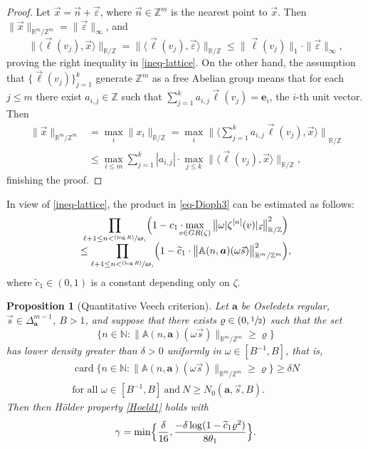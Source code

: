 \documentclass[11pt]{article}
\numberwithin{equation}{section}\newcommand{\Relation}[2][]{}\newtheorem*{prop*}{Proposition}
\newcommand{\sep}{:}
\newcommand\shalf{\sfrac{1}{2}}
\newcommand{\psfrac}[2]{\sfrac{(#1)}{#2}}
\let\epsilon\varepsilon
\theoremstyle{plain}
\newtheorem{prop}[theorem]{Proposition}
\theoremstyle{definition}
\let\wt\widetilde
\DeclareMathOperator{\card}{card}
\newcommand\bom{{\boldsymbol a}}\let\ba\bom
\newcommand\eb{{\boldsymbol e}}
\let\gam\gamma
\let\om\omega
\newcommand\Aa{\mathbb{A}}
\newcommand{\R}{\mathbb{R}}
\newcommand{\Z}{\mathbb{Z}}
\newcommand{\N}{\mathbb{N}}
\newcommand\be{\begin{equation}}
\newcommand\ee{\end{equation}}
\begin{document}
\begin{proof}
Let $\vec{x} = \vec{n} + \vec{\epsilon}$, where $\vec n\in \Z^m$ is the nearest point to $\vec x$. Then $\|\vec x\|_{\R^m/\Z^m}= \|\vec{\epsilon}\|_\infty$, and
\[
\|\langle \vec\ell(v_j), \vec{x}\rangle \|_{\R/\Z} = \|\langle \vec\ell(v_j), \vec{\epsilon}\rangle \|_{\R/\Z} \le \|\vec\ell(v_j)\|_1\cdot \|\vec{\epsilon}\|_\infty,
\]
proving the right inequality in \eqref{ineq-lattice}. On the other hand, the assumption that $\{\vec\ell(v_j)\}_{j=1}^k$ generate $\Z^m$ as a free Abelian group means that for each $j\le m$ there exist $a_{i,j}\in \Z$ such that $\sum_{j=1}^k a_{i,j} \vec\ell(v_j) = \eb_i$, the $i$-th unit vector. Then
\begin{align*}
\|\vec{x}\|_{\R^m/\Z^m} &= \max_i \|x_i\|_{\R/\Z} = \max_i {\bigl\|\bigl\langle\textstyle\sum_{j=1}^k a_{i,j} \vec\ell(v_j), \vec x \bigr\rangle \bigr\|}_{\R/\Z}\\[-5pt]
&\le \max_{i\le m}\sum_{j=1}^k |a_{i,j}| \cdot
\max_{j\le k} \|\langle \vec\ell(v_j), \vec{x}\rangle \|_{\R/\Z},
\end{align*}
finishing the proof.
\end{proof}

In view of \eqref{ineq-lattice}, the product in \eqref{eq-Dioph3} can be estimated as follows:
\begin{multline}
\label{lattice}
\prod_{\ell+1\le n < \psfrac{\log R}{4\theta_1}}
\Bigl( 1 - c_1\cdot \!\!\!\! \max_{v\in GR(\zeta)}{\bigl\| \om|\zeta^{[n]}(v)|_{\vec{s}}\bigr\|}^2_{\R/\Z}\Bigr)\\[-5pt]
\le \prod_{\ell+1 \le n < \psfrac{\log R}{4\theta_1}} \Bigl( 1 - \wt c_1\cdot \bigl\|\Aa(n,\bom) (\om\vec{s})\bigr\|^2_{\R^m/\Z^m} \Bigr),
\end{multline}
where $\wt c_1\in (0,1)$ is a constant depending only on $\zeta$.

\begin{prop}[Quantitative Veech criterion] \label{prop-quant}
Let $\bom$ be Oseledets regular, $\vec s\in \Delta_{\bom}^{m-1}$, $B>1$, and suppose that there exists $\varrho\in (0,\shalf)$ such that the set
\[
\bigl\{n\in \N\sep \big\|\Aa(n,\bom) (\om\vec{s})\bigr\|_{\R^m/\Z^m} \ge \varrho\bigr\}
\]
has lower density greater than $\delta>0$ uniformly in $\om\in [B^{-1},B]$, that is,
\begin{multline}
\label{eq-densi}
\card \bigl\{n\in \N\sep \big\|\Aa(n,\bom) (\om\vec{s})\bigr\|_{\R^m/\Z^m} \ge \varrho\bigr\} \ge \delta N\\
\text{for all }\om\in [B^{-1},B]\ \text{and}\ N \ge N_0(\bom,\vec s, B).
\end{multline}
Then then Hölder property \eqref{Hoeld1} holds with
\be \label{def-gamma}
\gam= \min\Bigl\{\frac{\delta}{16},\frac{-\delta\log(1-\wt c_1\varrho^2)}{8\theta_1}\Bigr\}.
\ee
\end{prop}
\end{document}
